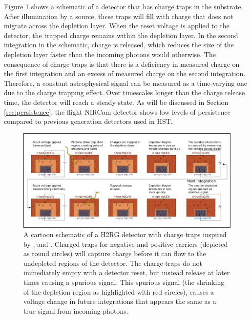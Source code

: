 \documentclass[]{aastex62}
\begin{document}
Figure \ref{fig:npSchematicTraps} shows a schematic of a detector that has charge traps in the substrate.
After illumination by a source, these traps will fill with charge that does not migrate across the depletion layer.
When the reset voltage is applied to the detector, the trapped charge remains within the depletion layer.
In the second integration in the schematic, charge is released, which reduces the size of the depletion layer faster than the incoming photons would otherwise.
The consequence of charge traps is that there is a deficiency in measured charge on the first integration and an excess of measured charge on the second integration.
Therefore, a constant astrophysical signal can be measured as a time-varying one due to the charge trapping effect.
Over timescales longer than the charge release time, the detector will reach a steady state.
As will be discussed in Section \ref{sec:persistence}, the flight NIRCam detector shows low levels of persistence compared to previous generation detectors used in HST.

\begin{figure}[!hbtp]
\centering
\includegraphics[width=.99\columnwidth]{charge_traps_photodiode.pdf}
\caption{A cartoon schematic of a H2RG detector with charge traps inspired by \citet{smith2008imgPersistence}, \citet{tulloch2018persistenceH2RG} and \citet{leisenring2016persistence}.
Charged traps for negative and positive carriers (depicted as round circles) will capture charge before it can flow to the undepleted regions of the detector.
The charge traps do not immediately empty with a detector reset, but instead release at later times causing a spurious signal.
This spurious signal (the shrinking of the depletion region as highlighted with red circles), causes a voltage change in future integrations that appears the same as a true signal from incoming photons.}\label{fig:npSchematicTraps}
\end{figure}
\end{document}
